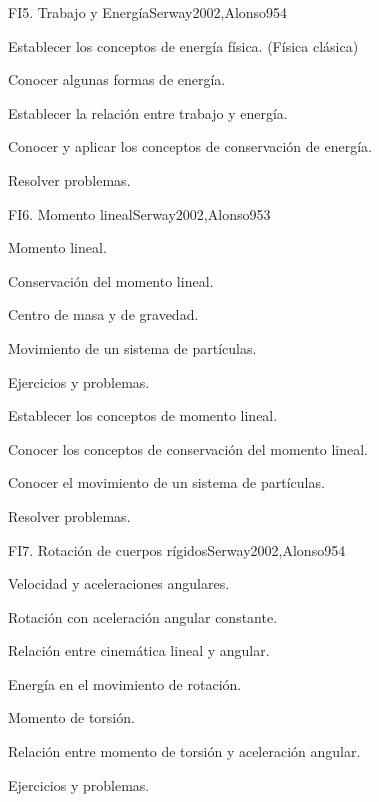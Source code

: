 \begin{sumilla}
\begin{unit}{FI5. Trabajo y Energ\'ia}{Serway2002,Alonso95}{4}
   \begin{objetivos}
      \item Establecer los conceptos de energ\'ia f\'isica. (F\'isica cl\'asica)
      \item Conocer algunas formas de energ\'ia.
      \item Establecer la relaci\'on entre trabajo y energ\'ia.
      \item Conocer y aplicar los conceptos de conservaci\'on de energ\'ia.
      \item Resolver problemas.
   \end{objetivos}
\end{unit}

\begin{unit}{FI6. Momento lineal}{Serway2002,Alonso95}{3}
\begin{topicos}
      \item Momento lineal.
      \item Conservaci\'on del momento lineal.
      \item Centro de masa y de gravedad.
      \item Movimiento de un sistema de part\'iculas.
      \item Ejercicios y problemas.
  \end{topicos}

   \begin{objetivos}
      \item Establecer los conceptos de momento lineal.
      \item Conocer los conceptos de conservaci\'on del momento lineal.
      \item Conocer el movimiento de un sistema de part\'iculas.
      \item Resolver problemas.
   \end{objetivos}
\end{unit}

\begin{unit}{FI7. Rotaci\'on de cuerpos r\'igidos}{Serway2002,Alonso95}{4}
\begin{topicos}
      \item Velocidad y aceleraciones angulares.
      \item Rotaci\'on con aceleraci\'on angular constante.
      \item Relaci\'on entre cinem\'atica lineal y angular.
      \item Energ\'ia en el movimiento de rotaci\'on.
      \item Momento de torsi\'on.
      \item Relaci\'on entre momento de torsi\'on y aceleraci\'on angular.
      \item Ejercicios y problemas.
   \end{topicos}


\end{unit}
\end{sumilla}
